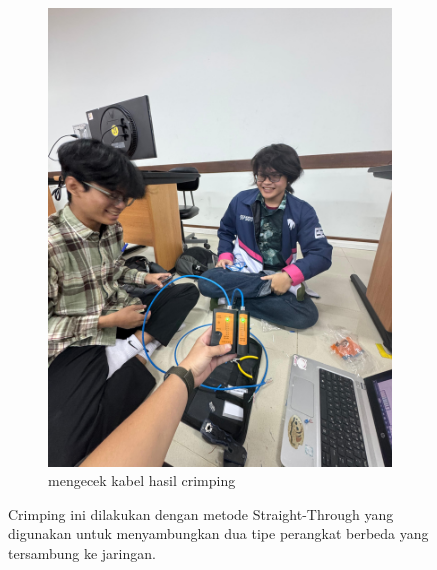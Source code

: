 \begin{figure}[H]
\begin{subfigure}[b]{0.3\linewidth}
      \includegraphics[width=\linewidth]{image/crimping2.jpg}
      \caption{mengecek kabel hasil crimping}
    \end{subfigure}
    \caption{Crimping ini dilakukan dengan metode Straight-Through yang digunakan untuk menyambungkan dua tipe perangkat berbeda yang tersambung ke jaringan.}
\end{figure}

